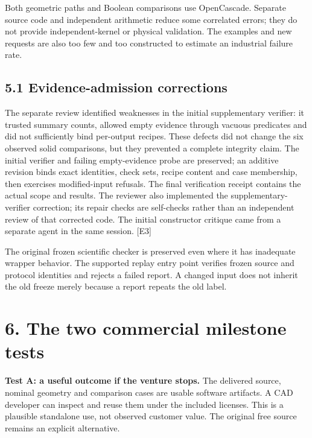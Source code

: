 \documentclass[11pt,letterpaper]{article}
\begin{document}
Both geometric paths and Boolean comparisons use OpenCascade. Separate source code and independent arithmetic reduce some correlated errors; they do not provide independent-kernel or physical validation. The examples and new requests are also too few and too constructed to estimate an industrial failure rate.

\hypertarget{evidence-admission-corrections}{%
\subsection{5.1 Evidence-admission corrections}\label{evidence-admission-corrections}}

The separate review identified weaknesses in the initial supplementary verifier: it trusted summary counts, allowed empty evidence through vacuous predicates and did not sufficiently bind per-output recipes. These defects did not change the six observed solid comparisons, but they prevented a complete integrity claim. The initial verifier and failing empty-evidence probe are preserved; an additive revision binds exact identities, check sets, recipe content and case membership, then exercises modified-input refusals. The final verification receipt contains the actual scope and results. The reviewer also implemented the supplementary-verifier correction; its repair checks are self-checks rather than an independent review of that corrected code. The initial constructor critique came from a separate agent in the same session. {[}E3{]}

The original frozen scientific checker is preserved even where it has inadequate wrapper behavior. The supported replay entry point verifies frozen source and protocol identities and rejects a failed report. A changed input does not inherit the old freeze merely because a report repeats the old label.

\hypertarget{the-two-commercial-milestone-tests}{%
\section{6. The two commercial milestone tests}\label{the-two-commercial-milestone-tests}}

\textbf{Test A: a useful outcome if the venture stops.} The delivered source, nominal geometry and comparison cases are usable software artifacts. A CAD developer can inspect and reuse them under the included licenses. This is a plausible standalone use, not observed customer value. The original free source remains an explicit alternative.
\end{document}
